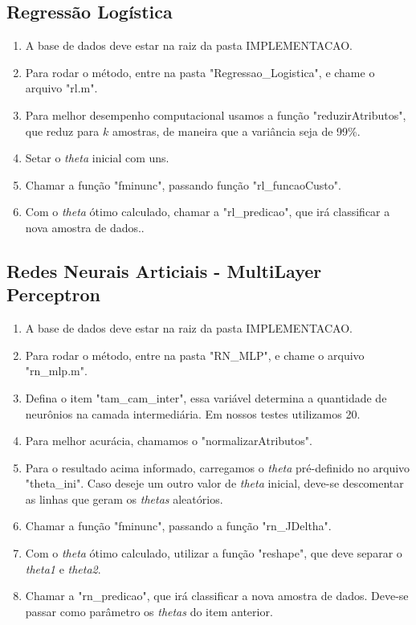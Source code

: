 \documentclass[10pt, conference, compsocconf]{IEEEtran}
\begin{document}
\subsection{Regressão Logística}
\begin{enumerate}
\item A base de dados deve estar na raiz da pasta IMPLEMENTACAO.
\item Para rodar o método, entre na pasta "Regressao\_Logistica", e chame o arquivo "rl.m".
\item Para melhor desempenho computacional usamos a função "reduzirAtributos", que reduz para $k$ amostras, de maneira que a variância seja de 99\%.
\item Setar o \textit{theta} inicial com uns.
\item Chamar a função "fminunc", passando função "rl\_funcaoCusto".
\item Com o \textit{theta} ótimo calculado, chamar a "rl\_predicao", que irá classificar a nova amostra de dados..
\end{enumerate}

\subsection{Redes Neurais Articiais - MultiLayer Perceptron}
\begin{enumerate}
\item A base de dados deve estar na raiz da pasta IMPLEMENTACAO.
\item Para rodar o método, entre na pasta "RN\_MLP", e chame o arquivo "rn\_mlp.m".
\item Defina o item "tam\_cam\_inter", essa variável determina a quantidade de neurônios na camada intermediária. Em nossos testes utilizamos 20.
\item Para melhor acurácia, chamamos o "normalizarAtributos".
\item Para o resultado acima informado, carregamos o \textit{theta} pré-definido no arquivo "theta\_ini". Caso deseje um outro valor de \textit{theta} inicial, deve-se descomentar as linhas que geram os \textit{thetas} aleatórios.
\item Chamar a função "fminunc",  passando a função "rn\_JDeltha".
\item Com o \textit{theta} ótimo calculado, utilizar a função "reshape", que deve separar o \textit{theta1} e \textit{theta2}.
\item Chamar a "rn\_predicao", que irá classificar a nova amostra de dados. Deve-se passar como parâmetro os \textit{thetas} do item anterior.
\end{enumerate}
\end{document}
